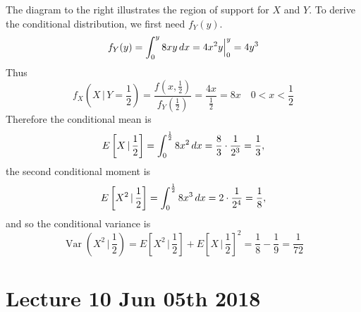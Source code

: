 \documentclass[notoc,notitlepage]{tufte-book}
\DeclareMathOperator{\Var}{Var }
\begin{document}
\begin{solution}
  The diagram to the right illustrates the region of support for $X$ and $Y$.
  To derive the conditional distribution, we first need $f_Y(y)$.
  \begin{equation*}
    f_Y(y) = \int_{0}^{y} 8xy \mathop{}\!d{x} = 4x^2y \Big|_{0}^{y} = 4y^3
  \end{equation*}
  Thus
  \begin{equation*}
    f_X \left(X \, | \, Y = \frac{1}{2}\right) = \frac{f\left(x, \frac{1}{2}\right)}{f_Y\left(\frac{1}{2}\right)} = \frac{4x}{\frac{1}{2}} = 8x \quad 0 < x < \frac{1}{2}
  \end{equation*}
  Therefore the conditional mean is
  \begin{equation*}
    E\left[ X  \, | \, \frac{1}{2} \right] = \int_{0}^{\frac{1}{2}} 8x^2 \mathop{}\!d{x} = \frac{8}{3} \cdot \frac{1}{2^3} = \frac{1}{3},
  \end{equation*}
  the second conditional moment is
  \begin{equation*}
    E \left[ X^2 \, | \, \frac{1}{2} \right] = \int_{0}^{\frac{1}{2}} 8x^3 \mathop{}\!d{x} = 2 \cdot \frac{1}{2^4} = \frac{1}{8},
  \end{equation*}
  and so the conditional variance is
  \begin{equation*}
    \Var \left( X^2 \, | \, \frac{1}{2} \right) = E\left[ X^2 \, | \, \frac{1}{2} \right] + E\left[ X \, | \, \frac{1}{2} \right]^2 = \frac{1}{8} - \frac{1}{9} = \frac{1}{72}
  \end{equation*}
\end{solution}




\chapter{Lecture 10 Jun 05th 2018}%
\label{chp:lecture_10_jun_05th_2018}
\end{document}
